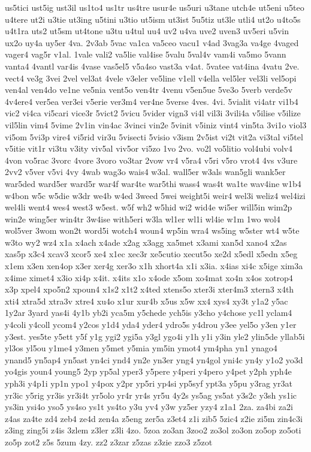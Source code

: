 {us5tici
ust5ig
ust3il
us1to4
us1tr
us4tre
usur4e
us5uri
u3tane
utch4e
ut5eni
u5teo
u4tere
ut2i
u3tie
ut3ing
u5tini
u3tio
ut5ism
ut3ist
5u5tiz
ut3le
utli4
ut2o
u4to5s
u4t1ra
uts2
ut5sm
ut4tone
u3tu
u4tul
uu4
uv2
u4va
uve2
uven3
uv5eri
u5vin
ux2o
uy4a
uy5er
4va.
2v3ab
5vac
va1ca
va5ceo
vacu1
v4ad
3vag3a
va4ge
4vaged
vager4
vag5r
v1al.
1vale
vali2
va5lie
val4ise
5valu
5val4v
vam4i
va5mo
5vann
vanta4
4vantl
var4is
4vase
vas5el5
v5a4so
vast3a
v4at.
5vatee
vat4ina
4vatu
2ve.
vect4
ve3g
3vei
2vel
vel3at
4vele
v3eler
ve5line
v1ell
v4ella
vel5ler
vel3li
vel5opi
ven4al
ven4do
ve1ne
ve5nia
vent5o
ven4tr
4venu
v5en5ue
5ve3o
5verb
verde5v
4v4ere4
ver5ea
ver3ei
v5erie
ver3m4
ver4ne
5verse
4ves.
4vi.
5vialit
vi4atr
vi1b4
vic2
vi4ca
vi5cari
vice3r
5vict2
5vicu
5vider
vign3
vi4l
vil3i
3vili4a
v5ilise
v5ilize
vil5lin
vim4
5vime
2v1in
vin4ac
3vinci
vin2e
5vinit
v5iniz
vint4
vin5ta
3vi1o
viol3
vi5om
5vi3p
vire4
vi5rid
vir3u
5visecti
5visio
v3ism
2v5ist
vi2t
vit2a
vi3tal
vi5tel
v5itie
vit1r
vi3tu
v3ity
viv5al
viv5or
vi5zo
1vo
2vo.
vo2l
vo5litio
vol4ubi
volv4
4von
vo5rac
3vorc
4vore
3voro
vo3tar
2vow
vr4
v5ra4
v5ri
v5ro
vrot4
4vs
v3ure
2vv2
v5ver
v5vi
4vy
4wab
wag3o
wais4
w3al.
wall5er
w3als
wan5gli
wank5er
war5ded
ward5er
ward5r
war4f
war4te
war5thi
wass4
was4t
wa1te
wav4ine
w1b4
w4bon
w5c
w5die
w3dr
we4b
w4ed
3weed
5wei
weight5i
weir4
wel3i
weliz4
wel4izi
wel4li
went4
wes4
west3
w5est.
w5f
wh2
w5hid
wi2
wid4e
wi5er
will5in
wim2p
win2e
wing5er
win4tr
3w4ise
with5eri
w3la
wl1er
wl1i
wl4ie
w1m
1wo
wol4
wol5ver
3wom
won2t
word5i
wotch4
woun4
wp5in
wra4
ws5ing
w5ster
wt4
w5te
w3to
wy2
wz4
x1a
x4ach
x4ade
x2ag
x3agg
xa5met
x3ami
xan5d
xano4
x2as
xas5p
x3c4
xcav3
xcor5
xe4
x1ec
xec3r
xe5cutio
xecut5o
xe2d
x5edl
x5edn
x5eg
x1em
x3en
xen4op
x3er
xer4g
xer3o
x1h
xhort4a
x1i
x3ia.
x4ias
xi4c
x5ige
xim3a
x4ime
ximet4
x3io
xi4p
x4it.
x4its
x1o
x4ode
x5om
xo4mat
xo4n
x4os
xotrop4
x3p
xpel4
xpo5n2
xpoun4
x1s2
x1t2
x4ted
xtens5o
xter3i
xter4m3
xtern3
x4th
xti4
xtra5d
xtra3v
xtre4
xu4o
x1ur
xur4b
x5us
x5w
xx4
xys4
xy3t
y1a2
y5ac
1y2ar
3yard
yas4i
4y1b
yb2i
yca5m
y5chede
ych5is
y3cho
y4chose
yc1l
yclam4
y4coli
y4coll
ycom4
y2cos
y1d4
yda4
yder4
ydro5s
y4drou
y3ee
yel5o
y3en
y1er
y3est.
yes5te
y5ett
y5f
y1g
ygi2
ygi5a
y3gl
ygo4i
y1h
y1i
y3in
yle2
ylin5de
yllab5i
yl3os
yl5ou
y1me4
y3men
y5met
y5mia
ym5in
ymot4
ym4pha
yn1
ynago4
ynand5
yn5ap4
yn5ast
yn4ci
ynd4
yn2e
yn3er
yng4
yn4gol
yni4c
yn4y
y1o2
yo3d
yo4gis
youn4
young5
2yp
yp5al
yper3
y5pere
y4peri
y4pero
y4pet
y2ph
yph4e
yph3i
y4p1i
yp1n
ypo1
y4pox
y2pr
yp5ri
yp4si
yp5syf
ypt3a
y5pu
y3rag
yr3at
yr3ic
y5rig
yr3is
yr3i4t
yr5olo
yr4r
yr4s
yr5u
4y2s
ys5ag
ys5at
y3s2c
y3sh
ys1ic
ys3in
ysi4o
yso5
ys4so
ys1t
ys4to
y3u
yv4
y3w
yz5er
yzy4
z1a1
2za.
za4bi
za2i
z4as
za4te
zd4
zeb4
ze4d
zen4a
z5eng
zer5a
z3et4
z1i
zib5
5zic4
z2ie
zi5m
zin4c3i
z3ing
zing5i
z4is
3zlem
z3ler
z3li
4zo.
5zoa
zo3an
3zoo2
zo3ol
zo3on
zo5op
zo5oti
zo5p
zot2
z5s
5zum
4zy.
zz2
z3zar
z5zas
z3zie
zzo3
z5zot
}
